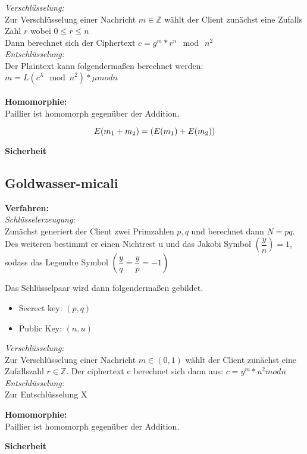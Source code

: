 \textit{Verschlüsselung:}\\
Zur Verschlüsselung einer Nachricht $ m \in \mathbb{Z} $ wählt der Client zunächst eine Zufalls Zahl $ r $ wobei $ 0 \leq r \leq n $\\
Dann berechnet sich der Ciphertext $ c = g^{m}*r^{n} \mod\ n^{2} $\\
\textit{Entschlüsselung:}\\
Der Plaintext kann folgendermaßen berechnet werden: $ m = L(c^{\lambda} \mod n^{2}) * \mu mod n $\\
\\
\textbf{Homomorphie:}\\
Paillier ist homomorph gegenüber der Addition.

$$ E(m \textsubscript{1} + m \textsubscript{2}) = (E(m \textsubscript{1}) + E(m \textsubscript{2}))$$

\textbf{Sicherheit}\\
 

\subsection{Goldwasser-micali}
\label{sec:Sec1.3.3}

\textbf{Verfahren:}\\

\textit{Schlüsselerzeugung:}\\
Zunächst generiert der Client zwei Primzahlen $ p,q  $ und berechnet dann $ N = pq $. Des weiteren bestimmt er einen Nichtrest u und das Jakobi Symbol $ (\dfrac{y}{n})=1 $, sodass das Legendre Symbol $ (\dfrac{y}{q} = \dfrac{y}{p} = -1) $

Das Schlüsselpaar wird dann folgendermaßen gebildet.
\begin{itemize}	
	\item Secrect key: $ (p,q) $
	\item Public Key: $(n,u)$	
\end{itemize}
\textit{Verschlüsselung:}\\
Zur Verschlüsselung einer Nachricht $ m \in (0,1) $ wählt der Client zunächst eine Zufallszahl $ r\in \mathbb{Z} $.
Der ciphertext c berechnet sich dann aus: $ c = y^{m}*u^{2} mod n $
\textit{Entschlüsselung:}\\
Zur Entschlüsselung			X

\textbf{Homomorphie:}\\

Paillier ist homomorph gegenüber der Addition.

\textbf{Sicherheit}\\

